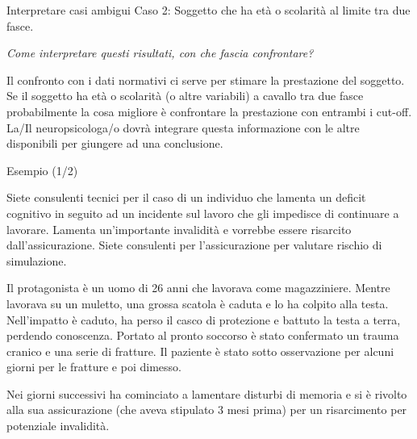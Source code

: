\documentclass[
  ignorenonframetext,
]{beamer}
\begin{document}
\begin{frame}{Interpretare casi ambigui}
\label{interpretare-casi-ambigui-1}
Caso 2: Soggetto che ha età o scolarità al limite tra due fasce.

\emph{Come interpretare questi risultati, con che fascia confrontare?}

Il confronto con i dati normativi ci serve per stimare la prestazione
del soggetto. Se il soggetto ha età o scolarità (o altre variabili) a
cavallo tra due fasce probabilmente la cosa migliore è confrontare la
prestazione con entrambi i cut-off. La/Il neuropsicologa/o dovrà
integrare questa informazione con le altre disponibili per giungere ad
una conclusione.
\end{frame}

\begin{frame}{Esempio (1/2)}
\label{esempio-12}
\scriptsize

Siete consulenti tecnici per il caso di un individuo che lamenta un
deficit cognitivo in seguito ad un incidente sul lavoro che gli
impedisce di continuare a lavorare. Lamenta un'importante invalidità e
vorrebbe essere risarcito dall'assicurazione. Siete consulenti per
l'assicurazione per valutare rischio di simulazione.

Il protagonista è un uomo di 26 anni che lavorava come magazziniere.
Mentre lavorava su un muletto, una grossa scatola è caduta e lo ha
colpito alla testa. Nell'impatto è caduto, ha perso il casco di
protezione e battuto la testa a terra, perdendo conoscenza. Portato al
pronto soccorso è stato confermato un trauma cranico e una serie di
fratture. Il paziente è stato sotto osservazione per alcuni giorni per
le fratture e poi dimesso.

Nei giorni successivi ha cominciato a lamentare disturbi di memoria e si
è rivolto alla sua assicurazione (che aveva stipulato 3 mesi prima) per
un risarcimento per potenziale invalidità.
\end{frame}
\end{document}
